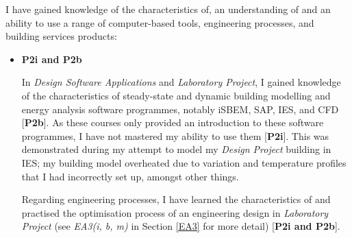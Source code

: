 I have gained knowledge of the characteristics of, an understanding of and an ability to use a range of computer-based tools, engineering processes, and building services products:
\begin{itemize}
     
    
    \item \textbf{P2i and P2b}
    
    In \textit{Design Software Applications} and \textit{Laboratory Project}, I gained knowledge of the characteristics of steady-state and dynamic building modelling and energy analysis software programmes, notably iSBEM, SAP, IES, and CFD [\textbf{P2b}].
    As these courses only provided an introduction to these software programmes, I have not mastered my ability to use them [\textbf{P2i}].
    This was demonstrated during my attempt to model my \textit{Design Project} building in IES; my building model overheated due to variation and temperature profiles that I had incorrectly set up, amongst other things.
    
    
    Regarding engineering processes, 
    I have learned the characteristics of and practised the optimisation process of an engineering design in \textit{Laboratory Project} (see \textit{EA3(i, b, m)} in Section \ref{EA3} for more detail) [\textbf{P2i and P2b}].
    

\end{itemize}

